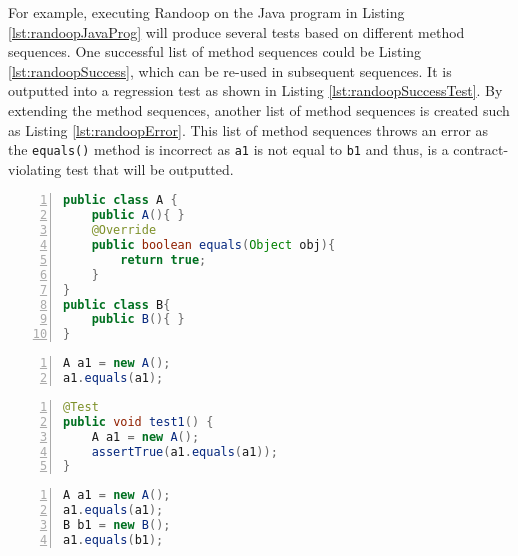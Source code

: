 For example, executing Randoop on the Java program in Listing \ref{lst:randoopJavaProg} will produce several tests based on different method sequences.
One successful list of method sequences could be Listing \ref{lst:randoopSuccess},  which can be re-used in subsequent sequences. It is outputted into a regression test as shown in Listing \ref{lst:randoopSuccessTest}.
By extending the method sequences, another list of method sequences is created such as Listing \ref{lst:randoopError}.
This list of method sequences throws an error as the \texttt{equals()} method is incorrect as \texttt{a1} is not equal to \texttt{b1} and thus, is a contract-violating test that will be outputted.

\begin{lstlisting}[language=Java, tabsize=3, numbers=left,
label={lst:randoopJavaProg}, caption={Example Java class},
captionpos=b, frame=single]
public class A {
	public A(){ }
	@Override
	public boolean equals(Object obj){
		return true;
	}
}
public class B{
	public B(){ }
}
\end{lstlisting}

\begin{lstlisting}[language=Java, tabsize=3, numbers=left,
label={lst:randoopSuccess}, caption={Successful method sequence for testing Listing \ref{lst:randoopJavaProg}},
captionpos=b, frame=single]
A a1 = new A();
a1.equals(a1);
\end{lstlisting}

\begin{lstlisting}[language=Java, tabsize=3, numbers=left,
label={lst:randoopSuccessTest}, caption={Test output for the successful method sequence in Listing \ref{lst:randoopSuccess}},
captionpos=b, frame=single]
@Test
public void test1() {
	A a1 = new A();
	assertTrue(a1.equals(a1));
}
\end{lstlisting}

\begin{lstlisting}[language=Java, tabsize=3, numbers=left,
label={lst:randoopError}, caption={Contract violating method sequence for testing Listing \ref{lst:randoopJavaProg}},
captionpos=b, frame=single]
A a1 = new A();
a1.equals(a1);
B b1 = new B();
a1.equals(b1);
\end{lstlisting}


